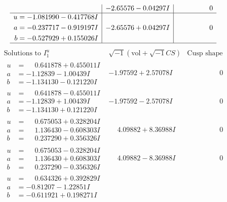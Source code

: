 \documentclass[1p]{elsarticle_modified}
\theoremstyle{definition}
\newcommand{\I}{\sqrt{-1}}
\begin{document}
$$\begin{array}{c|c|c}
 & -2.65576 - 0.04297 I & \phantom{-0.000000 } 0 \\ \hline\begin{aligned}
u &= -1.081990 - 0.417768 I \\
a &= -0.237717 - 0.919197 I \\
b &= -0.527929 + 0.155026 I\end{aligned}
 & -2.65576 + 0.04297 I & \phantom{-0.000000 } 0\\
 \hline 
 \end{array}$$\newpage$$\begin{array}{c|c|c}  
\text{Solutions to }I^u_{1}& \I (\text{vol} + \sqrt{-1}CS) & \text{Cusp shape}\\
 \hline 
\begin{aligned}
u &= \phantom{-}0.641878 + 0.455011 I \\
a &= -1.12839 - 1.00439 I \\
b &= -1.134130 - 0.121220 I\end{aligned}
 & -1.97592 + 2.57078 I & \phantom{-0.000000 } 0 \\ \hline\begin{aligned}
u &= \phantom{-}0.641878 - 0.455011 I \\
a &= -1.12839 + 1.00439 I \\
b &= -1.134130 + 0.121220 I\end{aligned}
 & -1.97592 - 2.57078 I & \phantom{-0.000000 } 0 \\ \hline\begin{aligned}
u &= \phantom{-}0.675053 + 0.328204 I \\
a &= \phantom{-}1.136430 - 0.608303 I \\
b &= \phantom{-}0.237290 + 0.356326 I\end{aligned}
 & \phantom{-}4.09882 + 8.36988 I & \phantom{-0.000000 } 0 \\ \hline\begin{aligned}
u &= \phantom{-}0.675053 - 0.328204 I \\
a &= \phantom{-}1.136430 + 0.608303 I \\
b &= \phantom{-}0.237290 - 0.356326 I\end{aligned}
 & \phantom{-}4.09882 - 8.36988 I & \phantom{-0.000000 } 0 \\ \hline\begin{aligned}
u &= \phantom{-}0.634326 + 0.392829 I \\
a &= -0.81207 - 1.22851 I \\
b &= -0.611921 + 0.198271 I\end{aligned}

\end{array}$$
\end{document}
